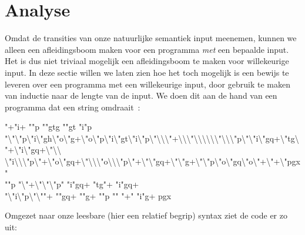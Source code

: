 \section{Analyse}
\label{sec:analyse}

Omdat de transities van onze natuurlijke semantiek input meenemen, kunnen we
alleen een afleidingsboom maken voor een programma \emph{met} een bepaalde
input. Het is dus niet triviaal mogelijk een afleidingsboom te maken voor willekeurige
input. In deze sectie willen we laten zien hoe het toch mogelijk is een bewijs
te leveren over een programma met een willekeurige input, door gebruik te maken
van inductie naar de lengte van de input. We doen dit aan de hand van een
programma dat een string omdraait~\cite{esolang:prog}:

\begin{smurf}
	\footnotesize
	"+"i+ ""p ""gtg ""gt "i"p\\
	"\textbackslash{}"\textbackslash{}"p\textbackslash{}"i\textbackslash{}"gh\textbackslash{}"o\textbackslash{}"g+\textbackslash{}"o\textbackslash{}"p\textbackslash{}"i\textbackslash{}"gt\textbackslash{}"i\textbackslash{}"p\textbackslash{}"\textbackslash{}\textbackslash{}\textbackslash{}"+\textbackslash{}\textbackslash{}\textbackslash{}"\textbackslash{}\textbackslash{}\textbackslash{}\textbackslash{}\textbackslash{}\textbackslash{}"\textbackslash{}\textbackslash{}\textbackslash{}"p\textbackslash{}"\textbackslash{}"i\textbackslash{}"gq+\textbackslash{}"tg\textbackslash{}"+\textbackslash{}"i\textbackslash{}"gq+\textbackslash{}"\textbackslash{}\textbackslash{}\\
    \textbackslash{}"i\textbackslash{}\textbackslash{}\textbackslash{}"p\textbackslash{}"+\textbackslash{}"o\textbackslash{}"gq+\textbackslash{}"\textbackslash{}\textbackslash{}\textbackslash{}"o\textbackslash{}\textbackslash{}\textbackslash{}"p\textbackslash{}"+\textbackslash{}"\textbackslash{}"gq+\textbackslash{}"\textbackslash{}"g+\textbackslash{}"\textbackslash{}"p\textbackslash{}"o\textbackslash{}"gq\textbackslash{}"o\textbackslash{}"+\textbackslash{}"+\textbackslash{}"pgx"\\
	""p "\textbackslash{}"+\textbackslash{}"\textbackslash{}"\textbackslash{}"p" "i"gq+ "tg"+ "i"gq+\\
	"\textbackslash{}"i\textbackslash{}"p\textbackslash{}"\textbackslash{}""+ ""gq+ ""g+ ""p "" "+" "i"g+ pgx
\end{smurf}

Omgezet naar onze leesbare (hier een relatief begrip) syntax ziet de code er zo
uit:

